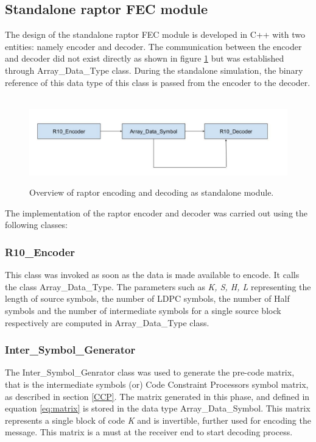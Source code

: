 \subsection{Standalone raptor FEC module}
\label{stand_rp}
The design of the standalone raptor FEC module is developed in C++ with two entities: namely encoder and decoder. The communication between the encoder and decoder did not exist directly as shown in figure \ref{stand_alone} but was established through Array\_Data\_Type class. During the standalone simulation, the binary reference of this data type of this class is passed from the encoder to the decoder.    
\begin{figure}[!htbp]
\begin{center}
\mbox{
\includegraphics[width=5.2in]{Figures/stand_alone}}
\caption{Overview of raptor encoding and decoding as standalone module.}
\label{stand_alone}
\end{center}
\end{figure}
The implementation of the raptor encoder and decoder was carried out using the following classes:
\subsubsection{R10\_Encoder} \label{r10_encoder}
This class was invoked as soon as the data is made available to encode. It calls the class Array\_Data\_Type. The parameters such as \textit{K, S, H, L} representing the length of source symbols, the number of LDPC symbols, the number of Half symbols and the number of intermediate symbols for a single source block respectively are computed in Array\_Data\_Type class.

\subsubsection{Inter\_Symbol\_Generator} \label{isg}
The Inter\_Symbol\_Genrator class was used to generate the pre-code matrix, that is the intermediate symbols (or) Code Constraint Processors symbol matrix, as described in section \ref{CCP}. The matrix generated in this phase, and defined in equation \ref{eq:matrix} is stored in the data type Array\_Data\_Symbol. This matrix represents a single block of code \textit{K} and is invertible, further used for encoding the message. This matrix is a must at the receiver end to start decoding process.

